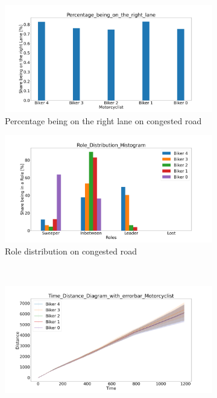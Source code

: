 \begin{figure}[H]
	\centering
	\begin{subfigure}[b]{0.45\textwidth}
		\centering
		\includegraphics[width=1.0\textwidth]{images/Sandstrase/Sandstrase_Percentage_being_on_the_right_lane_congested.png}
		\caption{Percentage being on the right lane on congested road}
	\end{subfigure}
	\hfill
	\begin{subfigure}[b]{0.45\textwidth}
		\centering
		\includegraphics[width=1.0\textwidth]{images/Sandstrase/Sandstrase_Role_Distribution_Histogram_congested.png}
		\caption{Role distribution on congested road}
	\end{subfigure}
	\\
	\begin{subfigure}[b]{0.45\textwidth}
		\centering
		\includegraphics[width=1.0\textwidth]{images/Sandstrase/Sandstrase_Time_Distance_Diagram_with_errorbar_congested.png}

\end{subfigure}
\end{figure}

